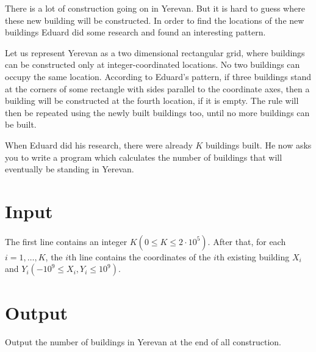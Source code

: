 

There is a lot of construction going on in Yerevan.
But it is hard to guess where these new building will be constructed.
In order to find the locations of the new buildings Eduard did some research and found an interesting pattern.

Let us represent Yerevan as a two dimensional rectangular grid, where buildings can be constructed only at integer-coordinated locations.
No two buildings can occupy the same location.
According to Eduard's pattern, if three buildings stand at the corners of some rectangle with sides parallel to the coordinate axes, then a building will be constructed at the fourth location, if it is empty.
The rule will then be repeated using the newly built buildings too, until no more buildings can be built.

When Eduard did his research, there were already $K$ buildings built.
He now asks you to write a program which calculates the number of buildings that will eventually be standing in Yerevan.



\section*{Input}
The first line contains an integer $K (0 \leq K \leq 2 \cdot 10^5)$.
After that, for each $i = 1, \dots, K$, the $i$th line contains the coordinates of the $i$th existing building $X_i$ and $Y_i (−10^9 \leq X_i, Y_i \leq 10^9)$.

\section*{Output}
Output the number of buildings in Yerevan at the end of all construction.
